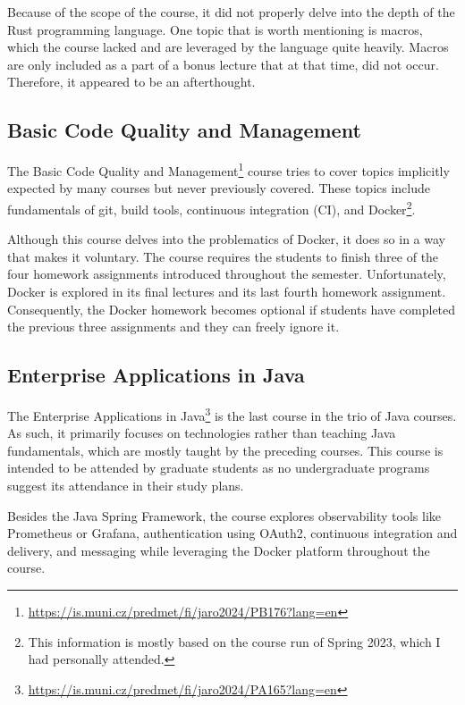 \documentclass[
  digital,
  color,
  oneside,
  nosansbold,
  nocolorbold,
  lof,
  nolot,
]{fithesis4}
\begin{document}
Because of the scope of the course, it did not properly delve into the depth of the Rust programming language. One topic that is worth mentioning is macros, which the course lacked and are leveraged by the language quite heavily. Macros are only included as a part of a bonus lecture that at that time, did not occur. Therefore, it appeared to be an afterthought.

\subsection{Basic Code Quality and Management}\label{code-quality-and-management}

The Basic Code Quality and Management\footnote{\url{https://is.muni.cz/predmet/fi/jaro2024/PB176?lang=en}} course tries to cover topics implicitly expected by many courses but never previously covered. These topics include fundamentals of git, build tools, continuous integration (CI), and Docker\footnote{This information is mostly based on the course run of Spring 2023, which I had personally attended.}. 

Although this course delves into the problematics of Docker, it does so in a way that makes it voluntary. The course requires the students to finish three of the four homework assignments introduced throughout the semester. Unfortunately, Docker is explored in its final lectures and its last fourth homework assignment. Consequently, the Docker homework becomes optional if students have completed the previous three assignments and they can freely ignore it.

\subsection{Enterprise Applications in Java}\label{enterprise-java-course}

The Enterprise Applications in Java\footnote{\url{https://is.muni.cz/predmet/fi/jaro2024/PA165?lang=en}} is the last course in the trio of Java courses. As such, it primarily focuses on technologies rather than teaching Java fundamentals, which are mostly taught by the preceding courses. This course is intended to be attended by graduate students as no undergraduate programs suggest its attendance in their study plans.

Besides the Java Spring Framework\cite{spring}, the course explores observability tools like Prometheus\cite{prometheus} or Grafana\cite{grafana}, authentication using OAuth2\cite{oauth2}, continuous integration and delivery, and messaging while leveraging the Docker platform throughout the course.
\end{document}
